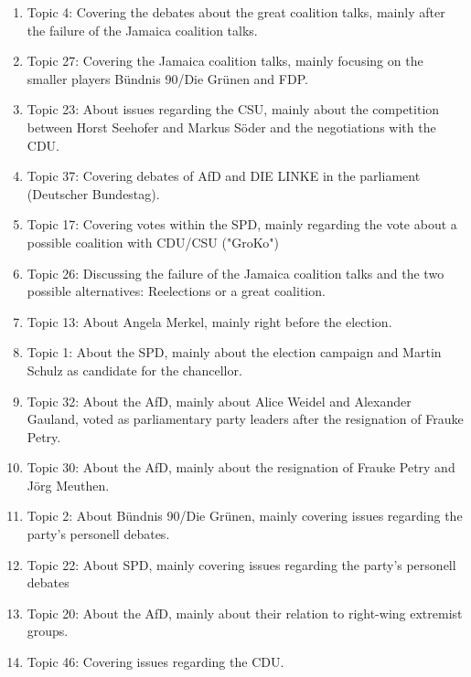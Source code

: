 \documentclass[12pt,a4paper,notitlepage]{article}
\begin{document}
\begin{enumerate}
	\item Topic 4: Covering the debates about the great coalition talks, mainly after the failure of the Jamaica coalition talks. 
	\item Topic 27: Covering the Jamaica coalition talks, mainly focusing on the smaller players Bündnis 90/Die Grünen and FDP.
	\item Topic 23: About issues regarding the CSU, mainly about the competition between Horst Seehofer and Markus Söder and the negotiations with the CDU.
	\item Topic 37: Covering debates of AfD and DIE LINKE in the parliament (Deutscher Bundestag).
	\item Topic 17: Covering votes within the SPD, mainly regarding the vote about a possible coalition with CDU/CSU ("GroKo")
	\item Topic 26: Discussing the failure of the Jamaica coalition talks and the two possible alternatives: Reelections or a great coalition.
	\item Topic 13: About Angela Merkel, mainly right before the election.
	\item Topic 1: About the SPD, mainly about the election campaign and Martin Schulz as candidate for the chancellor.
	\item Topic 32: About the AfD, mainly about Alice Weidel and Alexander Gauland, voted as parliamentary party leaders after the resignation of Frauke Petry.
	\item Topic 30: About the AfD, mainly about the resignation of Frauke Petry and Jörg Meuthen.
	\item Topic 2: About Bündnis 90/Die Grünen, mainly covering issues regarding the party's personell debates.
	\item Topic 22: About SPD, mainly covering issues regarding the party's personell debates
	\item Topic 20: About the AfD, mainly about their relation to right-wing extremist groups.
	\item Topic 46: Covering issues regarding the CDU.
\end{enumerate}   
\end{document}
